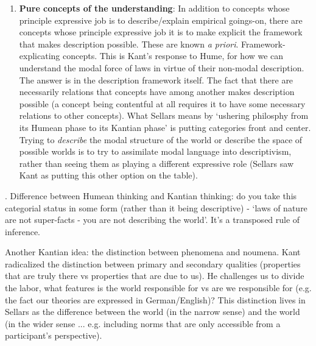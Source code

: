 \begin{enumerate}
\item \textbf{Pure concepts of the understanding}: In addition to concepts whose principle expressive job is to describe/explain empirical goings-on, there are concepts whose principle expressive job it is to make explicit the framework that makes description possible. These are known \textit{a priori}. Framework-explicating concepts. This is Kant's response to Hume, for how we can understand the modal force of laws in virtue of their non-modal description. The answer is in the description framework itself. The fact that there are necessarily relations that concepts have among another makes description possible (a concept being contentful at all requires it to have some necessary relations to other concepts). What Sellars means by `ushering philosphy from its Humean phase to its Kantian phase' is putting categories front and center. Trying to \emph{describe} the modal structure of the world or describe the space of possible worlds is to try to assimilate modal language into descriptivism, rather than seeing them as playing a different expressive role (Sellars saw Kant as putting this other option on the table).
\end{enumerate}. Difference between Humean thinking and Kantian thinking: do you take this categorial status in some form (rather than it being descriptive) - `laws of nature are not super-facts - you are not describing the world'. It's a transposed rule of inference.

Another Kantian idea: the distinction between phenomena and noumena. Kant radicalized the distinction between primary and secondary qualities (properties that are truly there vs properties that are due to us). He challenges us to divide the labor, what features is the world responsible for vs are we responsible for (e.g. the fact our theories are expressed in German/English)? This distinction lives in Sellars as the difference between the world (in the narrow sense) and the world (in the wider sense ... e.g. including norms that are only accessible from a participant's perspective).
